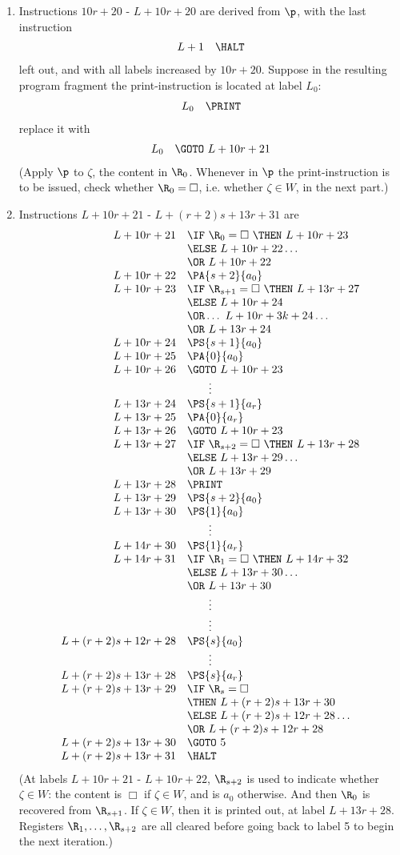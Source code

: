 \begin{enumerate}[1.]
\begin{enumerate}[(a)]
\begin{enumerate}[(1)]
\item Instructions $10r + 20$ - $L + 10r + 20$ are derived from $\p$, with the last instruction
\[
\begin{array}{rl}
L + 1 & \HALT
\end{array}
\]
left out, and with all labels increased by $10r + 20$. Suppose in the resulting program fragment the print-instruction is located at label $L_0$:
\[
\begin{array}{rl}
L_0 & \PRINT
\end{array}
\]
replace it with
\[
\begin{array}{rl}
L_0 & \GOTO \ L + 10r + 21
\end{array}
\]
(Apply $\p$ to $\zeta$, the content in $\R_0$. Whenever in $\p$ the print-instruction is to be issued, check whether $\R_0 = \Box$, i.e. whether $\zeta \in W$, in the next part.)
\item Instructions $L + 10r + 21$ - $L + (r + 2)s + 13r + 31$ are
\[
\begin{array}{rl}
L + 10r + 21 & \IF \ \R_0 = \Box \ \THEN \ L + 10r + 23 \cr
\ & \ELSE \ L + 10r + 22 \ldots \cr
\ & \OR \ L + 10r + 22 \cr
L + 10r + 22 & \PA{s + 2}{a_0} \cr
L + 10r + 23 & \IF \ \R_{s + 1} = \Box \ \THEN \ L + 13r + 27 \cr
\ & \ELSE \ L + 10r + 24 \cr
\ & \OR \ldots \ L + 10r + 3k + 24 \ldots \cr
\ & \OR \ L + 13r + 24 \cr
L + 10r + 24 & \PS{s + 1}{a_0} \cr
L + 10r + 25 & \PA{0}{a_0} \cr
L + 10r + 26 & \GOTO \ L + 10r + 23 \cr
\multicolumn{2}{c}{\vdots} \cr
L + 13r + 24 & \PS{s + 1}{a_r} \cr
L + 13r + 25 & \PA{0}{a_r} \cr
L + 13r + 26 & \GOTO \ L + 10r + 23 \cr
L + 13r + 27 & \IF \ \R_{s + 2} = \Box \ \THEN \ L + 13r + 28 \cr
\ & \ELSE \ L + 13r + 29 \ldots \cr
\ & \OR \ L + 13r + 29 \cr
L + 13r + 28 & \PRINT \cr
L + 13r + 29 & \PS{s + 2}{a_0} \cr
L + 13r + 30 & \PS{1}{a_0} \cr
\multicolumn{2}{c}{\vdots} \cr
L + 14r + 30 & \PS{1}{a_r} \cr
L + 14r + 31 & \IF \ \R_1 = \Box \ \THEN \ L + 14r + 32 \cr
\ & \ELSE \ L + 13r + 30 \ldots \cr
\ & \OR \ L + 13r + 30 \cr
\multicolumn{2}{c}{\vdots} \cr
\multicolumn{2}{c}{\vdots} \cr
L + (r + 2)s + 12r + 28 & \PS{s}{a_0} \cr
\multicolumn{2}{c}{\vdots} \cr
L + (r + 2)s + 13r + 28 & \PS{s}{a_r} \cr
L + (r + 2)s + 13r + 29 & \IF \ \R_s = \Box \cr
\ & \THEN \ L + (r + 2)s + 13r + 30 \cr
\ & \ELSE \ L + (r + 2)s + 12r + 28 \ldots \cr
\ & \OR \ L + (r + 2)s + 12r + 28 \cr
L + (r + 2)s + 13r + 30 & \GOTO \ 5 \cr
L + (r + 2)s + 13r + 31 & \HALT
\end{array}
\]
(At labels $L + 10r + 21$ - $L + 10r + 22$, $\R_{s + 2}$ is used to indicate whether $\zeta \in W$: the content is $\Box$ if $\zeta \in W$, and is $a_0$ otherwise. And then $\R_0$ is recovered from $\R_{s + 1}$. If $\zeta \in W$, then it is printed out, at label $L + 13r + 28$. Registers $\R_1, \ldots, \R_{s + 2}$ are all cleared before going back to label 5 to begin the next iteration.)

\end{enumerate}
\end{enumerate}
\end{enumerate}
